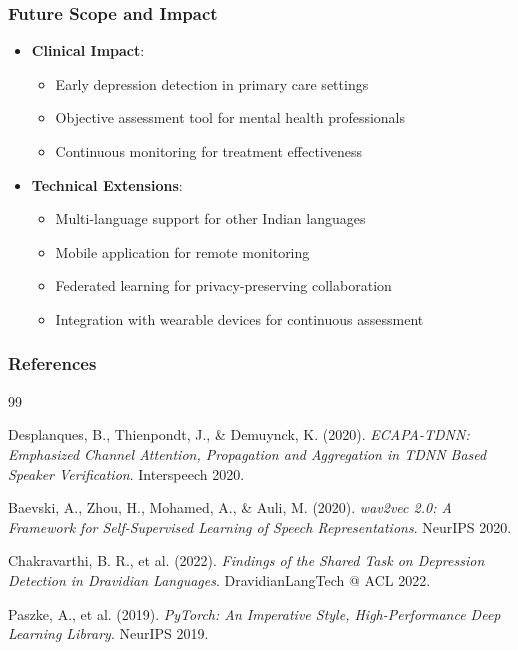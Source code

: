 \documentclass{beamer}
\begin{document}
\begin{frame}
\frametitle{Future Scope and Impact}
\begin{itemize}
    \item \textbf{Clinical Impact}:
    \begin{itemize}
        \item Early depression detection in primary care settings
        \item Objective assessment tool for mental health professionals
        \item Continuous monitoring for treatment effectiveness
    \end{itemize}
    \item \textbf{Technical Extensions}:
    \begin{itemize}
        \item Multi-language support for other Indian languages
        \item Mobile application for remote monitoring
        \item Federated learning for privacy-preserving collaboration
        \item Integration with wearable devices for continuous assessment
    \end{itemize}
\end{itemize}
\end{frame}

\begin{frame}
\frametitle{References}
\scriptsize
\begin{thebibliography}{99}

Desplanques, B., Thienpondt, J., \& Demuynck, K. (2020). 
\textit{ECAPA-TDNN: Emphasized Channel Attention, Propagation and Aggregation in TDNN Based Speaker Verification}. 
Interspeech 2020.

Baevski, A., Zhou, H., Mohamed, A., \& Auli, M. (2020). 
\textit{wav2vec 2.0: A Framework for Self-Supervised Learning of Speech Representations}. 
NeurIPS 2020.

Chakravarthi, B. R., et al. (2022). 
\textit{Findings of the Shared Task on Depression Detection in Dravidian Languages}. 
DravidianLangTech @ ACL 2022.

Paszke, A., et al. (2019). 
\textit{PyTorch: An Imperative Style, High-Performance Deep Learning Library}. 
NeurIPS 2019.

\end{thebibliography}
\end{frame}
\end{document}
